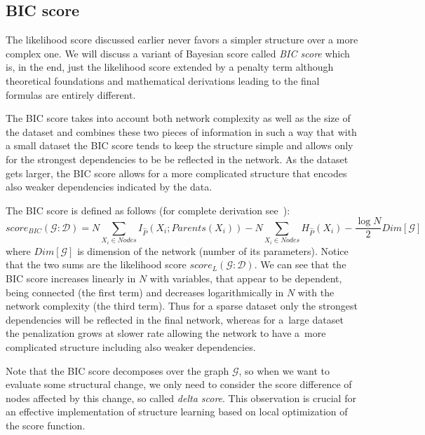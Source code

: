 \documentclass[english,cover]{fitthesis} %
\newcommand{\term}[1]{\emph{#1}}           %
\begin{document}
\subsection{BIC score}
The likelihood score discussed earlier never favors a simpler structure over a more complex one. We will discuss a variant of Bayesian score called \term{BIC score} which is, in the end, just the likelihood score extended by a penalty term although theoretical foundations and mathematical derivations leading to the final formulas are entirely different.


The BIC score takes into account both network complexity as well as the size of the dataset and combines these two pieces of information in such a way that with a small dataset the BIC score tends to keep the structure simple and allows only for the strongest dependencies to be be reflected in the network. As the dataset gets larger, the BIC score allows for a more complicated structure that encodes also weaker dependencies indicated by the data.

The BIC score is defined as follows (for complete derivation see~\cite[p.~794]{pgm}):
\begin{equation}\label{eq:bic_score}
    score_{BIC}(\mathcal{G} : \mathcal{D}) = N \!\!\!\!\!\! \sum_{X_i \in Nodes} \!\!\!\!\!\! I_{\hat P}(X_i;Parents(X_i)) - N \!\!\!\!\!\! \sum_{X_i \in Nodes} \!\!\!\!\!\! H_{\hat P}(X_i) - \frac{\log N}{2} Dim[\mathcal{G}]
\end{equation}
where $Dim[\mathcal{G}]$ is dimension of the network (number of its parameters). Notice that the two sums are the likelihood score $score_{L}(\mathcal{G} : \mathcal{D})$. We can see that the BIC score increases linearly in $N$ with variables, that appear to be dependent, being connected (the first term) and decreases logarithmically in $N$ with the network complexity (the third term). Thus for a sparse dataset only the strongest dependencies will be reflected in the final network, whereas for a~large dataset the penalization grows at slower rate allowing the network to have a~more complicated structure including also weaker dependencies.

Note that the BIC score decomposes over the graph $\mathcal{G}$, so when we want to evaluate some structural change, we only need to consider the score difference of nodes affected by this change, so called \term{delta score}. This observation is crucial for an effective implementation of structure learning based on local optimization of the score function. 
\end{document}
